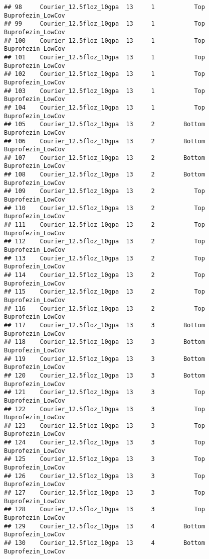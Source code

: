 \documentclass[
]{article}
\begin{document}
\begin{verbatim}
## 98     Courier_12.5floz_10gpa  13     1           Top      Buprofezin_LowCov
## 99     Courier_12.5floz_10gpa  13     1           Top      Buprofezin_LowCov
## 100    Courier_12.5floz_10gpa  13     1           Top      Buprofezin_LowCov
## 101    Courier_12.5floz_10gpa  13     1           Top      Buprofezin_LowCov
## 102    Courier_12.5floz_10gpa  13     1           Top      Buprofezin_LowCov
## 103    Courier_12.5floz_10gpa  13     1           Top      Buprofezin_LowCov
## 104    Courier_12.5floz_10gpa  13     1           Top      Buprofezin_LowCov
## 105    Courier_12.5floz_10gpa  13     2        Bottom      Buprofezin_LowCov
## 106    Courier_12.5floz_10gpa  13     2        Bottom      Buprofezin_LowCov
## 107    Courier_12.5floz_10gpa  13     2        Bottom      Buprofezin_LowCov
## 108    Courier_12.5floz_10gpa  13     2        Bottom      Buprofezin_LowCov
## 109    Courier_12.5floz_10gpa  13     2           Top      Buprofezin_LowCov
## 110    Courier_12.5floz_10gpa  13     2           Top      Buprofezin_LowCov
## 111    Courier_12.5floz_10gpa  13     2           Top      Buprofezin_LowCov
## 112    Courier_12.5floz_10gpa  13     2           Top      Buprofezin_LowCov
## 113    Courier_12.5floz_10gpa  13     2           Top      Buprofezin_LowCov
## 114    Courier_12.5floz_10gpa  13     2           Top      Buprofezin_LowCov
## 115    Courier_12.5floz_10gpa  13     2           Top      Buprofezin_LowCov
## 116    Courier_12.5floz_10gpa  13     2           Top      Buprofezin_LowCov
## 117    Courier_12.5floz_10gpa  13     3        Bottom      Buprofezin_LowCov
## 118    Courier_12.5floz_10gpa  13     3        Bottom      Buprofezin_LowCov
## 119    Courier_12.5floz_10gpa  13     3        Bottom      Buprofezin_LowCov
## 120    Courier_12.5floz_10gpa  13     3        Bottom      Buprofezin_LowCov
## 121    Courier_12.5floz_10gpa  13     3           Top      Buprofezin_LowCov
## 122    Courier_12.5floz_10gpa  13     3           Top      Buprofezin_LowCov
## 123    Courier_12.5floz_10gpa  13     3           Top      Buprofezin_LowCov
## 124    Courier_12.5floz_10gpa  13     3           Top      Buprofezin_LowCov
## 125    Courier_12.5floz_10gpa  13     3           Top      Buprofezin_LowCov
## 126    Courier_12.5floz_10gpa  13     3           Top      Buprofezin_LowCov
## 127    Courier_12.5floz_10gpa  13     3           Top      Buprofezin_LowCov
## 128    Courier_12.5floz_10gpa  13     3           Top      Buprofezin_LowCov
## 129    Courier_12.5floz_10gpa  13     4        Bottom      Buprofezin_LowCov
## 130    Courier_12.5floz_10gpa  13     4        Bottom      Buprofezin_LowCov

\end{verbatim}
\end{document}
